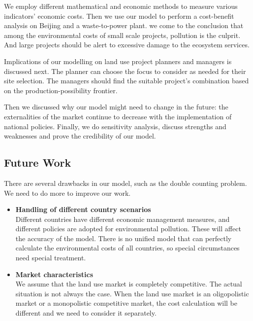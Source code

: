 \documentclass{mcmthesis}
\begin{document}
			We employ different mathematical and economic methods to measure various indicators' economic costs. Then we use our model to perform a cost-benefit analysis on Beijing and a waste-to-power plant. we come to the conclusion that among the environmental costs of small scale projects, pollution is the culprit. And large projects should be alert to excessive damage to the ecosystem services.
			
			Implications of our modelling on land use project planners and managers is discussed next. The planner can choose the focus to consider as needed for their site selection. The managers should find the suitable project's combination based on the production-possibility frontier. 
			
			Then we discussed why our model might need to change in the future: the externalities of the market continue to decrease with the implementation of national policies. Finally, we do sensitivity analysis, discuss strengths and weaknesses and prove the credibility of our model.
			
		\subsection{Future Work}
		
			There are several drawbacks in our model, such as the double counting problem. We need to do more to improve our work.
			
			\begin{itemize}
				
				\item \textbf{Handling of different country scenarios}\\
				Different countries have different economic management measures, and different policies are adopted for environmental pollution. These will affect the accuracy of the model. There is no unified model that can perfectly calculate the environmental costs of all countries, so special circumstances need special treatment.
				
				\item \textbf{Market characteristics}\\
				We assume that the land use market is completely competitive. The actual situation is not always the case. When the land use market is an oligopolistic market or a monopolistic competitive market, the cost calculation will be different and we need to consider it separately.
				
			\end{itemize}
	
	\newpage
		
	\nocite{*}
	
		
	\newpage
\end{document}
